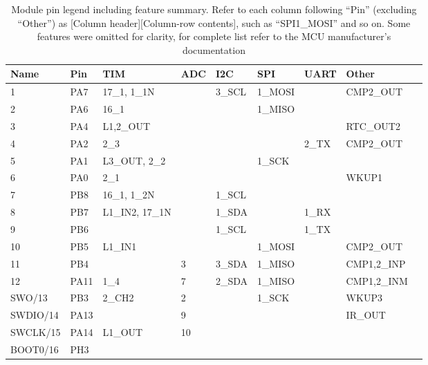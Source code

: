 \begin{table}[H]
\begin{center}
\caption{\label{table:module-pin-legend}Module pin legend including feature summary. Refer to each column following ``Pin'' (excluding ``Other'') as [Column header][Column-row contents], such as ``SPI1\_MOSI'' and so on. Some features were omitted for clarity, for complete list refer to the MCU manufacturer's documentation}
    \begin{tabular}{|l|l|l|l|l|l|l|l|l|} \hline
    \textbf{Name} & \textbf{Pin} & \textbf{TIM} & \textbf{ADC} & \textbf{I2C} & \textbf{SPI} & \textbf{UART} & \textbf{Other}\\ \hline
    1        & PA7  & 17\_1, 1\_1N    &     & 3\_SCL & 1\_MOSI &             & CMP2\_OUT          \\ \hline
    2        & PA6  & 16\_1          &     &       & 1\_MISO &             &                    \\ \hline
    3        & PA4  & L1,2\_OUT      &     &       &        &             & RTC\_OUT2           \\ \hline
    4        & PA2  & 2\_3           &     &       &        & 2\_TX & CMP2\_OUT           \\ \hline
    5        & PA1  & L3\_OUT, 2\_2   &     &       & 1\_SCK  &             &                    \\ \hline
    6        & PA0  & 2\_1           &     &       &        &             & WKUP1   \\ \hline
    7        & PB8  & 16\_1, 1\_2N    &     & 1\_SCL &        &             &                    \\ \hline
    8        & PB7  & L1\_IN2, 17\_1N &     & 1\_SDA &        & 1\_RX        &                    \\ \hline
    9        & PB6  &               &     & 1\_SCL &        & 1\_TX        &                    \\ \hline
    10       & PB5  & L1\_IN1        &     &       & 1\_MOSI &             & CMP2\_OUT          \\ \hline
    11       & PB4  &               & 3   & 3\_SDA & 1\_MISO &             & CMP1,2\_INP        \\ \hline
    12       & PA11 & 1\_4           & 7   & 2\_SDA & 1\_MISO &             & CMP1,2\_INM        \\ \hline
    SWO/13   & PB3  & 2\_CH2         & 2   &       & 1\_SCK  &             & WKUP3 \\ \hline
    SWDIO/14 & PA13 &               & 9   &       &        &             & IR\_OUT             \\ \hline
    SWCLK/15 & PA14 & L1\_OUT        & 10  &       &        &             &                    \\ \hline
    BOOT0/16 & PH3  &               &     &       &        &             &                    \\ \hline
    \end{tabular}
\end{center}
\end{table}
